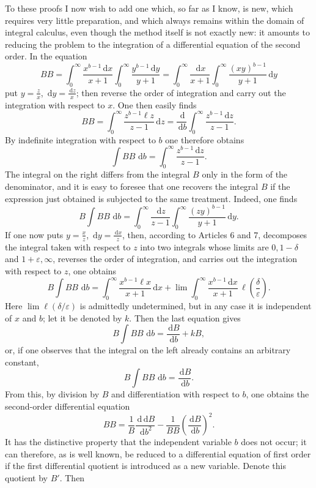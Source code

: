 \documentclass[11pt]{article}
\newcommand{\dd}{\,\mathrm d}
\begin{document}
To these proofs I now wish to add one which, so far as I know, is new, which requires very little preparation, and which always remains within the domain of integral calculus, even though the method itself is not exactly new: it amounts to reducing the problem to the integration of a differential equation of the second order. In the equation
\[
B B=\int_0^\infty\frac{x^{b-1}\dd x}{x+1}
     \int_0^\infty\frac{y^{b-1}\dd y}{y+1}
=\int_0^\infty\frac{\dd x}{x+1}
     \int_0^\infty\frac{(xy)^{b-1}}{y+1}\dd y
\]
put $y=\frac zx$, $\dd y=\frac{\dd z}{x}$; then reverse the order of integration and carry out the integration with respect to $x$. One then easily finds
\begin{equation}
B B=\int_0^\infty\frac{z^{b-1}\ell z}{z-1}\dd z
=\frac{\dd}{\dd b}\int_0^\infty\frac{z^{b-1}\dd z}{z-1}.
\tag{27}
\end{equation}
By indefinite integration with respect to $b$ one therefore obtains
\[
\int B B\,\dd b=\int_0^\infty\frac{z^{b-1}\dd z}{z-1}.
\]
The integral on the right differs from the integral $B$ only in the form of the denominator, and it is easy to foresee that one recovers the integral $B$ if the expression just obtained is subjected to the same treatment. Indeed, one finds
\[
B\int B B\,\dd b
=\int_0^\infty\frac{\dd z}{z-1}
  \int_0^\infty\frac{(zy)^{b-1}}{y+1}\dd y.
\]
If one now puts $y=\frac xz$, $\dd y=\frac{\dd x}{z}$, then, according to Articles 6 and 7, decomposes the integral taken with respect to $z$ into two integrals whose limits are $0,1-\delta$ and $1+\varepsilon,\infty$, reverses the order of integration, and carries out the integration with respect to $z$, one obtains
\[
B\int B B\,\dd b
=\int_0^\infty\frac{x^{b-1}\ell x}{x+1}\dd x
+\lim\int_0^\infty\frac{x^{b-1}\dd x}{x+1}\,\ell\!\left(\frac{\delta}{\varepsilon}\right).
\]
Here $\lim \ell(\delta/\varepsilon)$ is admittedly undetermined, but in any case it is independent of $x$ and $b$; let it be denoted by $k$. Then the last equation gives
\[
B\int B B\,\dd b=\frac{\dd B}{\dd b}+kB,
\]
or, if one observes that the integral on the left already contains an arbitrary constant,
\begin{equation}
B\int B B\,\dd b=\frac{\dd B}{\dd b}.
\tag{28}
\end{equation}
From this, by division by $B$ and differentiation with respect to $b$, one obtains the second-order differential equation
\[
B B=\frac1B\frac{\dd\dd B}{\dd b^2}
-\frac1{B B}\left(\frac{\dd B}{\dd b}\right)^2.
\]
It has the distinctive property that the independent variable $b$ does not occur; it can therefore, as is well known, be reduced to a differential equation of first order if the first differential quotient is introduced as a new variable. Denote this quotient by $B'$. Then
\end{document}
